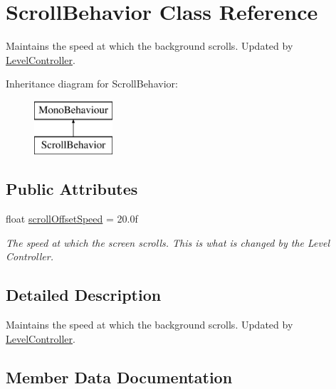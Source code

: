 \hypertarget{class_scroll_behavior}{}\section{Scroll\+Behavior Class Reference}
\label{class_scroll_behavior}


Maintains the speed at which the background scrolls. Updated by \mbox{\hyperlink{class_level_controller}{Level\+Controller}}.  


Inheritance diagram for Scroll\+Behavior\+:\begin{figure}[H]
\begin{center}
\leavevmode
\includegraphics[height=2.000000cm]{class_scroll_behavior}
\end{center}
\end{figure}
\subsection*{Public Attributes}
\begin{DoxyCompactItemize}
\item 
float \mbox{\hyperlink{class_scroll_behavior_a0633f458f0e92a843c58eb301523a7b2}{scroll\+Offset\+Speed}} = 20.\+0f
\begin{DoxyCompactList}\small\item\em The speed at which the screen scrolls. This is what is changed by the Level Controller. \end{DoxyCompactList}\end{DoxyCompactItemize}


\subsection{Detailed Description}
Maintains the speed at which the background scrolls. Updated by \mbox{\hyperlink{class_level_controller}{Level\+Controller}}. 

\subsection{Member Data Documentation}
\mbox{\label{class_scroll_behavior_a0633f458f0e92a843c58eb301523a7b2}} 
